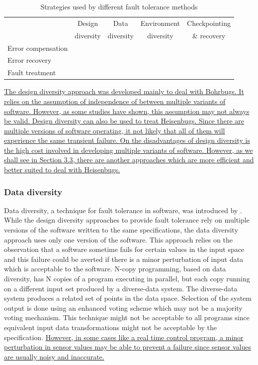 \documentclass[a4paper, 11pt]{article}
\newcommand{\cmark}{\ding{51}}%
\begin{document}
\begin{table}[h]
\centering
\caption{Strategies used by different fault tolerance methods}
\begin{tabular}{l c c c c }
\toprule
                   & Design    & Data      & Environment & Checkpointing \\
                   & diversity & diversity & diversity   & \& recovery   \\
\midrule
Error compensation & \cmark    & \cmark    &             &               \\
Error recovery     &           &           &             & \cmark        \\
Fault treatment    &           &           & \cmark      &               \\
\bottomrule
\end{tabular}
\end{table}

\ul{The design diversity approach was developed mainly to deal with Bohrbugs. It relies on the assumption of independence of between multiple variants of software. However, as some studies have shown, this assumption may not always be valid. Design diversity can also be used to treat Heisenbugs. Since there are multiple versions of software operating, it not likely that all of them will experience the same transient failure. On the disadvantages of design diversity is the high cost involved in developing multiple variants of software. However, as we shall see in Section 3.3, there are another approaches which are more efficient and better suited to deal with Heisenbugs.}

\subsubsection{Data diversity}
Data diversity, a technique for fault tolerance in software, was introduced by \citet{ammann1988data}. While the design diversity approaches to provide fault tolerance rely on multiple versions of the software written to the same specifications, the data diversity approach uses only one version of the software. This approach relies on the observation that a software sometime fails for certain values in the input space and this failure could be averted if there is a minor perturbation of input data which is acceptable to the software. N-copy programming, based on data diversity, has N copies of a program executing in parallel, but each copy running on a different input set produced by a diverse-data system. The diverse-data system produces a related set of points in the data space. Selection of the system output is done using an enhanced voting scheme which may not be a majority voting mechanism. This technique might not be acceptable to all programs since equivalent input data transformations might not be acceptable by the specification. \ul{However, in some cases like a real time control program, a minor perturbation in sensor values may be able to prevent a failure since sensor values are usually noisy and inaccurate.}
\end{document}
